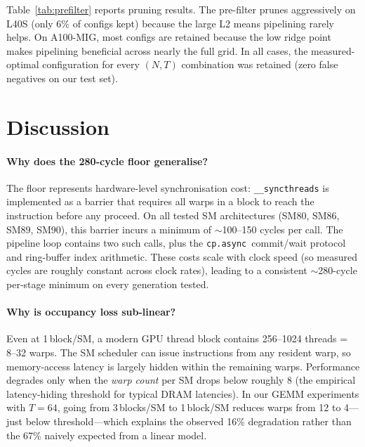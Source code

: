\documentclass[10pt,twocolumn]{article}
\newcommand{\cpasync}{\texttt{cp.async}}
\begin{document}
Table~\ref{tab:prefilter} reports pruning results.  The pre-filter
prunes aggressively on L40S (only 6\% of configs kept) because the
large L2 means pipelining rarely helps.  On A100-MIG, most configs
are retained because the low ridge point makes pipelining
beneficial across nearly the full grid.  In all cases, the
measured-optimal configuration for every $(N, T)$ combination was
retained (zero false negatives on our test set).

\section{Discussion}
\label{sec:discussion}

\paragraph{Why does the 280-cycle floor generalise?}
The floor represents hardware-level synchronisation cost:
\texttt{\_\_syncthreads} is implemented as a barrier that requires
all warps in a block to reach the instruction before any proceed.
On all tested SM architectures (SM80, SM86, SM89, SM90), this
barrier incurs a minimum of $\sim$100--150 cycles per call.  The
pipeline loop contains two such calls, plus the
\cpasync{}~commit/wait protocol and ring-buffer index arithmetic.
These costs scale with clock speed (so measured cycles are roughly
constant across clock rates), leading to a consistent $\sim$280-cycle
per-stage minimum on every generation tested.

\paragraph{Why is occupancy loss sub-linear?}
Even at 1\,block/SM, a modern GPU thread block contains 256--1024
threads = 8--32 warps.  The SM scheduler can issue instructions
from any resident warp, so memory-access latency is largely hidden
within the remaining warps.  Performance degrades only when the
\emph{warp count} per SM drops below roughly 8 (the empirical
latency-hiding threshold for typical DRAM latencies).  In our GEMM
experiments with $T = 64$, going from 3\,blocks/SM to 1\,block/SM
reduces warps from 12 to 4---just below threshold---which explains
the observed 16\% degradation rather than the 67\% naively expected
from a linear model.
\end{document}
